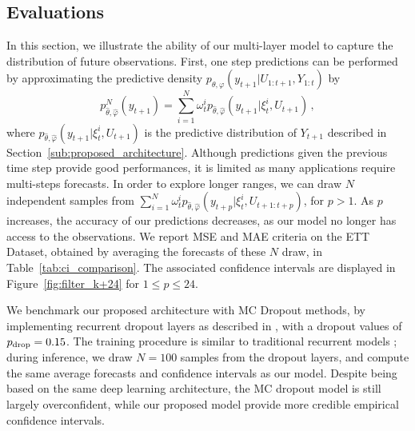 \documentclass[journal]{IEEEtran}
\begin{document}
\subsection{Evaluations}%
\label{sub:evaluations}

In this section, we illustrate the ability of our multi-layer model to capture the distribution of future observations.
First, one step predictions can be performed by approximating the predictive density $p_{\theta,\varphi}(y_{t+1}|U_{1:t+1},Y_{1:t})$ by
$$
	p^N_{\widehat\theta,\widehat\varphi}(y_{t+1})= \sum_{i=1}^{N}\omega_t^i p_{\widehat\theta,\widehat\varphi}(y_{t+1}|\xi_t^i,U_{t+1})\,,
$$
where $ p_{\widehat\theta,\widehat\varphi}(y_{t+1}|\xi_t^i,U_{t+1})$ is the predictive distribution of $Y_{t+1}$ described in Section~\ref{sub:proposed_architecture}.
Although predictions given the previous time step provide good performances, it is limited as many applications require multi-steps forecasts.
In order to explore longer ranges, we can draw $N$ independent samples from $\sum_{i=1}^{N}\omega_t^i p_{\widehat\theta,\widehat\varphi}(y_{t+p}|\xi_t^i,U_{t+1:t+p})$, for $p>1$.
As $p$ increases, the accuracy of our predictions decreases, as our model no longer has access to the observations.
We report MSE and MAE criteria on the ETT Dataset, obtained by averaging the forecasts of these $N$ draw, in Table~\ref{tab:ci_comparison}.
The associated confidence intervals are displayed in Figure~\ref{fig:filter_k+24} for $1\leq p \leq 24$.

We benchmark our proposed architecture with MC Dropout methods, by implementing recurrent dropout layers as described in \cite{Gal2016NIPS}, with a dropout values of $p_\textnormal{drop}=0.15$.
The training procedure is similar to traditional recurrent models ; during inference, we draw $N=100$ samples from the dropout layers, and compute the same average forecasts and confidence intervals as our model.
Despite being based on the same deep learning architecture, the MC dropout model is still largely overconfident, while our proposed model provide more credible empirical confidence intervals.
\end{document}
